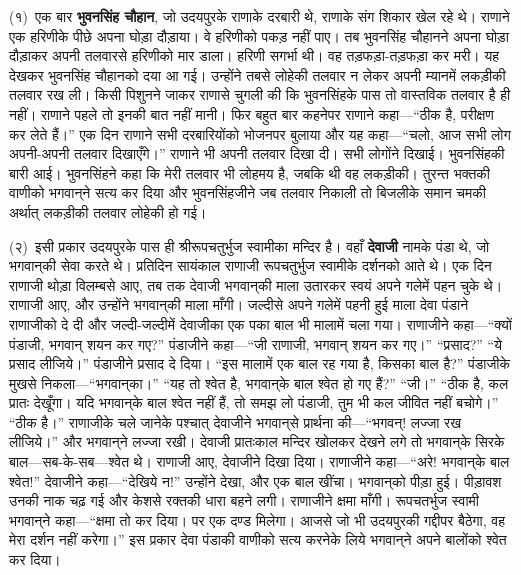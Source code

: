 \begin{sloppypar}\justifying{}
(१)~एक बार \textbf{भुवनसिंह चौहान}, जो उदयपुरके राणाके दरबारी थे, राणाके संग शिकार खेल रहे थे। राणाने एक हरिणीके पीछे अपना घोड़ा दौड़ाया। वे हरिणीको पकड़ नहीं पाए। तब भुवनसिंह चौहानने अपना घोड़ा दौड़ाकर अपनी तलवारसे हरिणीको मार डाला। हरिणी सगर्भा थी। वह तड़फड़ा-तड़फड़ा कर मरी। यह देखकर भुवनसिंह चौहानको दया आ गई। उन्होंने तबसे लोहेकी तलवार न लेकर अपनी म्यानमें लकड़ीकी तलवार रख ली। किसी पिशुनने जाकर राणासे चुगली की कि भुवनसिंहके पास तो वास्तविक तलवार है ही नहीं। राणाने पहले तो इनकी बात नहीं मानी। फिर बहुत बार कहनेपर राणाने कहा—“ठीक है, परीक्षण कर लेते हैं।” एक दिन राणाने सभी दरबारियोंको भोजनपर बुलाया और यह कहा—“चलो, आज सभी लोग अपनी-अपनी तलवार दिखाएँगे।” राणाने भी अपनी तलवार दिखा दी। सभी लोगोंने दिखाई। भुवनसिंहकी बारी आई। भुवनसिंहने कहा कि मेरी तलवार भी लोहमय है, जबकि थी वह लकड़ीकी। तुरन्त भक्तकी वाणीको भगवान्‌‍ने सत्य कर दिया और भुवनसिंहजीने जब तलवार निकाली तो बिजलीके समान चमकी अर्थात् लकड़ीकी तलवार लोहेकी हो गई।
\end{sloppypar}
\begin{sloppypar}\justifying{}
(२)~इसी प्रकार उदयपुरके पास ही श्रीरूपचतुर्भुज स्वामीका मन्दिर है। वहाँ \textbf{देवाजी} नामके पंडा थे, जो भगवान्‌‍की सेवा करते थे। प्रतिदिन सायंकाल राणाजी रूपचतुर्भुज स्वामीके दर्शनको आते थे। एक दिन राणाजी थोड़ा विलम्बसे आए, तब तक देवाजी भगवान्‌‍की माला उतारकर स्वयं अपने गलेमें पहन चुके थे। राणाजी आए, और उन्होंने भगवान्‌‍की माला माँगी। जल्दीसे अपने गलेमें पहनी हुई माला देवा पंडाने राणाजीको दे दी और जल्दी-जल्दीमें देवाजीका एक पका बाल भी मालामें चला गया। राणाजीने कहा—“क्यों पंडाजी, भगवान् शयन कर गए?” पंडाजीने कहा—“जी राणाजी, भगवान् शयन कर गए।” “प्रसाद?” “ये प्रसाद लीजिये।” पंडाजीने प्रसाद दे दिया। “इस मालामें एक बाल रह गया है, किसका बाल है?” पंडाजीके मुखसे निकला—“भगवान्‌का।” “यह तो श्वेत है, भगवान्‌‍के बाल श्वेत हो गए हैं?” “जी।” “ठीक है, कल प्रातः देखूँगा। यदि भगवान्‌‍के बाल श्वेत नहीं हैं, तो समझ लो पंडाजी, तुम भी कल जीवित नहीं बचोगे।” “ठीक है।” राणाजीके चले जानेके पश्चात् देवाजीने भगवान्‌‍से प्रार्थना की—“भगवन्‌! लज्जा रख लीजिये।” और भगवान्‌‍ने लज्जा रखी। देवाजी प्रातःकाल मन्दिर खोलकर देखने लगे तो भगवान्‌‍के सिरके बाल—सब-के-सब—श्वेत थे। राणाजी आए, देवाजीने दिखा दिया। राणाजीने कहा—“अरे! भगवान्‌‍के बाल श्वेत!” देवाजीने कहा—“देखिये न!” उन्होंने देखा, और एक बाल खींचा। भगवान्‌‍को पीड़ा हुई। पीड़ावश उनकी नाक चढ़ गई और केशसे रक्तकी धारा बहने लगी। राणाजीने क्षमा माँगी। रूपचतर्भुज स्वामी भगवान्‌‍ने कहा—“क्षमा तो कर दिया। पर एक दण्ड मिलेगा। आजसे जो भी उदयपुरकी गद्दीपर बैठेगा, वह मेरा दर्शन नहीं करेगा।” इस प्रकार देवा पंडाकी वाणीको सत्य करनेके लिये भगवान्‌‍ने अपने बालोंको श्वेत कर दिया।
\end{sloppypar}
